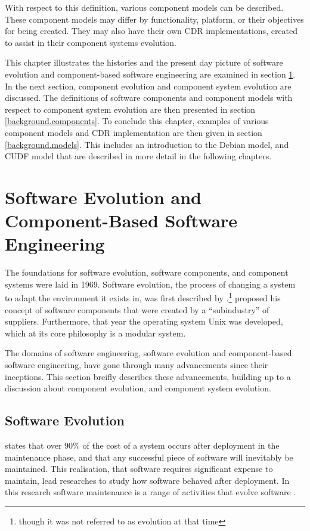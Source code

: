 With respect to this definition, various component models can be described.
These component models may differ by functionality, platform, or their objectives for being created.
They may also have their own CDR implementations, created to assist in their component systems evolution. 

This chapter illustrates the histories and the present day picture of software evolution and component-based software engineering are examined in section \ref{background.histories}.
In the next section, component evolution and component system evolution are discussed.
The definitions of software components and component models with respect to component system evolution are then presented in section \ref{background.components}.
To conclude this chapter,  examples of various component models and CDR implementation are then given in section \ref{background.models}.
This includes an introduction to the Debian model, and CUDF model that are described in more detail in the following chapters.

\section{Software Evolution and Component-Based Software Engineering}
\label{background.histories}
The foundations for software evolution, software components, and component systems were laid in 1969.
Software evolution, the process of changing a system to adapt the environment it exists in, 
was first described by \cite{Lehman1969}.\footnote{though it was not referred to as evolution at that time}
\cite{McIlroy1969} proposed his concept of software components that were created by a ``subindustry'' of suppliers.
Furthermore, that year the operating system Unix \citep{raymond2003art} was developed, which at its core philosophy is a modular system.

The domains of software engineering, software evolution and component-based software engineering, have gone through many advancements since their inceptions.
This section breifly describes these advancements, building up to a discussion about component evolution, and component system evolution.

\subsection{Software Evolution}
\cite{Brooks1975} states that over 90\% of the cost of a system occurs after deployment in the maintenance phase,
and that any successful piece of software will inevitably be maintained.
This realisation, that software requires significant expense to maintain, lead researches to study how software behaved after deployment.
In this research software maintenance is a range of activities that evolve software \citep{lehman1980}.

